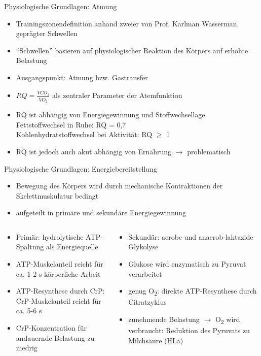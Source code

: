 \documentclass[colorBG,slideColor,9pt]{beamer}
\begin{document}
\begin{frame}{Physiologische Grundlagen: Atmung}
\begin{itemize}
\item Trainingszonendefinition anhand zweier von Prof. Karlman Wasserman geprägter Schwellen
\item "`Schwellen"' basieren auf physiologischer Reaktion des Körpers auf erhöhte Belastung
\item Ausgangspunkt: Atmung bzw. Gastransfer
\item $RQ = \frac{\dot{V}CO_2}{\dot{V}O_2}$ als zentraler Parameter der Atemfunktion
\item RQ ist abhängig von Energiegewinnung und Stoffwechsellage\\Fettstoffwechsel in Ruhe: RQ = 0,7\\Kohlenhydratstoffwechsel bei Aktivität: RQ $\geq$ 1
\item RQ ist jedoch auch akut abhängig von Ernährung $\rightarrow$ problematisch
\end{itemize}
\end{frame}

\begin{frame}{Physiologische Grundlagen: Energiebereitstellung}
\begin{itemize}
\item Bewegung des Körpers wird durch mechanische Kontraktionen der Skelettmuskulatur bedingt
\item aufgeteilt in primäre und sekundäre Energiegewinnung
\end{itemize}
\begin{columns}
\begin{column}{0.5\linewidth}
\begin{itemize}
	\item Primär: hydrolytische ATP-Spaltung als Energiequelle
	\item ATP-Muskelanteil reicht für ca. 1-2 s körperliche Arbeit
	\item ATP-Resynthese durch CrP: CrP-Muskelanteil reicht für ca. 5-6 s
	\item CrP-Konzentration für andauernde Belastung zu niedrig
\end{itemize}
\end{column}
\begin{column}{0.5\linewidth}
\begin{itemize}
	\item Sekundär: aerobe und anaerob-laktazide Glykolyse
	\item Glukose wird enzymatisch zu Pyruvat verarbeitet
	\item genug O\textsubscript{2}: direkte ATP-Resynthese durch Citratzyklus
	\item zunehmende Belastung $\rightarrow$ O\textsubscript{2} wird verbraucht: Reduktion des Pyruvats zu Milchsäure (HLa)
\end{itemize}
\end{column}
\end{columns}
\end{frame}
\end{document}
